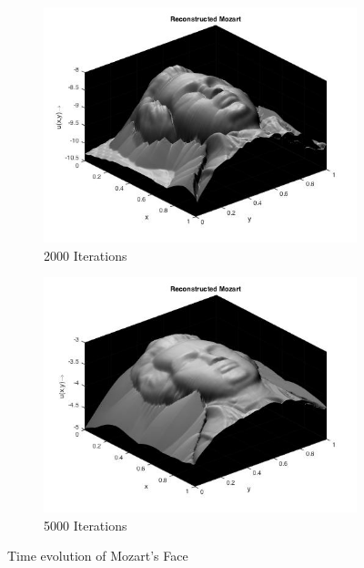 \begin{center}
\begin{figure}
\begin{subfigure}{0.5\textwidth}
			\includegraphics[scale = 0.4]{Images/moz/moz_2000.jpg}
			\caption{2000 Iterations}
		\end{subfigure}
		\begin{subfigure}{0.5\textwidth}
			\centering
			\includegraphics[scale = 0.4]{Images/moz/moz_5000.jpg}
			\caption{5000 Iterations}
		\end{subfigure}
		\caption{Time evolution of Mozart's Face}
		\label{fig:evol}
	\end{figure}
\end{center}

